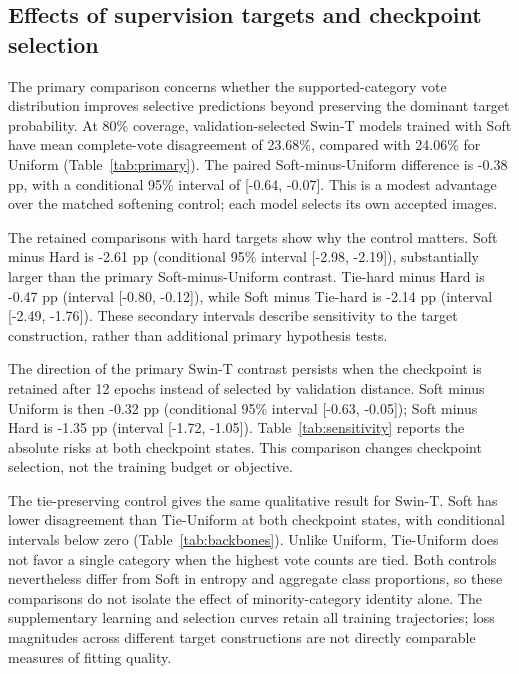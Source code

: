 \subsection{Effects of supervision targets and checkpoint selection}
The primary comparison concerns whether the supported-category vote distribution improves selective predictions beyond preserving the dominant target probability. At 80\% coverage, validation-selected Swin-T models trained with Soft have mean complete-vote disagreement of 23.68\%, compared with 24.06\% for Uniform (Table~\ref{tab:primary}). The paired Soft-minus-Uniform difference is -0.38 pp, with a conditional 95\% interval of [-0.64, -0.07]. This is a modest advantage over the matched softening control; each model selects its own accepted images.


The retained comparisons with hard targets show why the control matters. Soft minus Hard is -2.61 pp (conditional 95\% interval [-2.98, -2.19]), substantially larger than the primary Soft-minus-Uniform contrast. Tie-hard minus Hard is -0.47 pp (interval [-0.80, -0.12]), while Soft minus Tie-hard is -2.14 pp (interval [-2.49, -1.76]). These secondary intervals describe sensitivity to the target construction, rather than additional primary hypothesis tests.

The direction of the primary Swin-T contrast persists when the checkpoint is retained after 12 epochs instead of selected by validation distance. Soft minus Uniform is then -0.32 pp (conditional 95\% interval [-0.63, -0.05]); Soft minus Hard is -1.35 pp (interval [-1.72, -1.05]). Table~\ref{tab:sensitivity} reports the absolute risks at both checkpoint states. This comparison changes checkpoint selection, not the training budget or objective.


The tie-preserving control gives the same qualitative result for Swin-T. Soft has lower disagreement than Tie-Uniform at both checkpoint states, with conditional intervals below zero (Table~\ref{tab:backbones}). Unlike Uniform, Tie-Uniform does not favor a single category when the highest vote counts are tied. Both controls nevertheless differ from Soft in entropy and aggregate class proportions, so these comparisons do not isolate the effect of minority-category identity alone. The supplementary learning and selection curves retain all training trajectories; loss magnitudes across different target constructions are not directly comparable measures of fitting quality.

